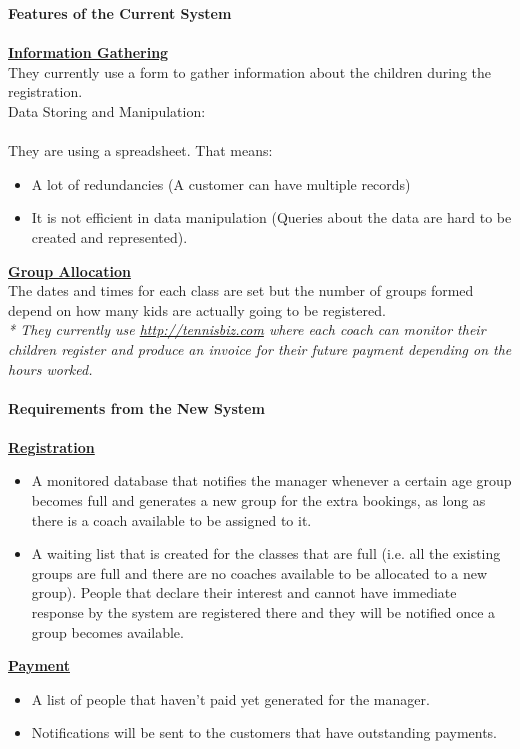 \documentclass{l3proj}
\begin{document}
\textbf{\Large{Features of the Current System}}\\
\\\textbf{\underline{Information Gathering}}\\
They currently use a form to gather information about the children during the registration.\\
Data Storing and Manipulation:\\
\\They are using a spreadsheet. That means:\\
\begin{itemize}
	\item A lot of redundancies (A customer can have multiple records)
	\item It is not efficient in data manipulation (Queries about the data are hard to be created and represented).
\end{itemize}
\textbf{\underline{Group Allocation}}\\
The dates and times for each class are set but the number of groups formed depend on how many kids are actually going to be registered.\\
\emph{* They currently use \url{http://tennisbiz.com} where each coach can monitor their children register and produce an invoice for their future payment depending on the hours worked.}\\
\\ \textbf{\Large{Requirements from the New System}}\\
\\ \textbf{\underline{Registration}}
	\begin{itemize}
		\item A monitored database that notifies the manager whenever a certain age group becomes full and generates a new group for the extra bookings, as long as there is a coach available to be assigned to it.
		\item A waiting list that is created for the classes that are full (i.e. all the existing groups are full and there are no coaches available to be allocated to a new group). People that declare their interest and cannot have immediate response by the system are registered there and they will be notified once a group becomes available.
	\end{itemize}
\textbf{\underline{Payment}}
	\begin{itemize}
	\item A list of people that haven’t paid yet generated for the manager.
	\item Notifications will be sent to the customers that have outstanding payments.
	\end{itemize}
\end{document}
